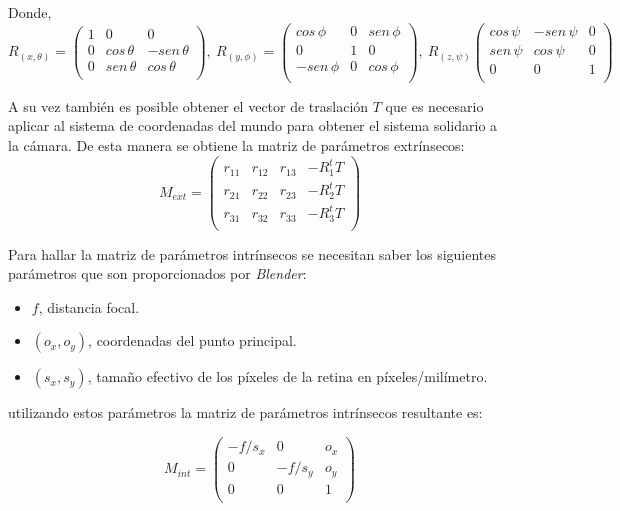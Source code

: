  Donde,
 \[R_{(x,\theta)} = \begin{pmatrix}
		1 &   0         &  0\\
		0 & cos\,\theta & -sen\,\theta\\
		0 & sen\,\theta & cos\,\theta\\ 
\end{pmatrix}, ~
R_{(y,\phi)}=\begin{pmatrix}
		cos\,\phi  & 0 & sen\,\phi\\
		0          & 1 & 0\\
		-sen\,\phi &0  & cos\,\phi\\ 
\end{pmatrix}, ~
R_{(z,\psi)}\begin{pmatrix}
		cos\,\psi & -sen\,\psi & 0\\
		sen\,\psi & cos\,\psi  & 0\\
		 0          & 0            & 1\\ 
\end{pmatrix}\]

A su vez también es posible obtener el vector de traslación $T$ que es necesario aplicar al sistema de coordenadas del mundo para obtener el sistema solidario a la cámara. De esta manera se obtiene la matriz de parámetros extrínsecos:
\[
		M_{ext}=\begin{pmatrix}
			r_{11} & r_{12} & r_{13} &-R^t_1 T\\
			r_{21} & r_{22} & r_{23} &-R^t_2 T\\
			r_{31} & r_{32} & r_{33} &-R^t_3 T\\
		\end{pmatrix}
\] 

Para hallar la matriz de parámetros intrínsecos se necesitan saber los siguientes parámetros que son proporcionados por \emph{Blender}: 
\begin{itemize}
\item $f$, distancia focal.
\item $(o_x, o_y)$, coordenadas del punto principal.
\item $(s_x,s_y)$, tamaño efectivo de los píxeles de la retina en píxeles/milímetro.
\end{itemize}

\hspace{-0.6cm}utilizando estos parámetros la matriz de parámetros intrínsecos resultante es:

\[M_{int}=\begin{pmatrix}
			-f/s_x & 0      & o_x\\
			0      & -f/s_y & o_y\\
			0      & 0      & 1\\
		\end{pmatrix} \]
 
